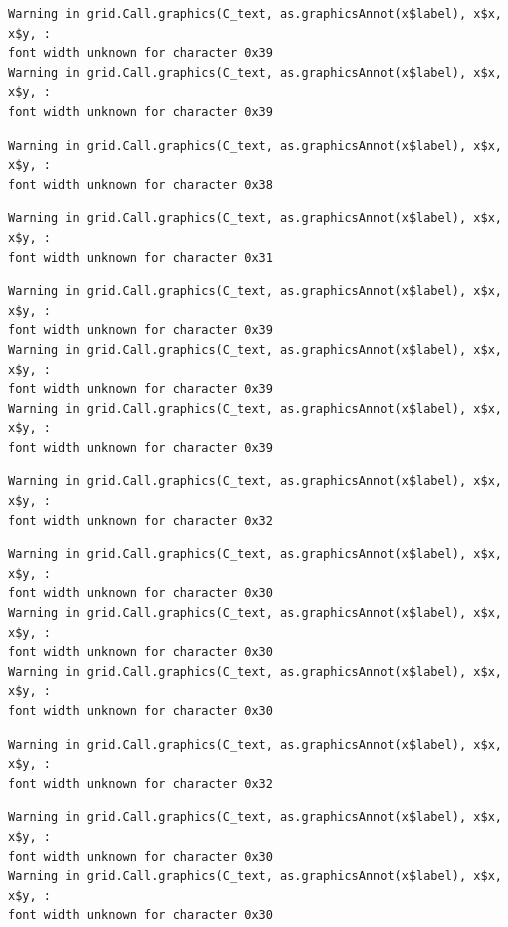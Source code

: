 \documentclass[
  letterpaper,
]{scrbook}
\begin{document}
\begin{verbatim}
Warning in grid.Call.graphics(C_text, as.graphicsAnnot(x$label), x$x, x$y, :
font width unknown for character 0x39
Warning in grid.Call.graphics(C_text, as.graphicsAnnot(x$label), x$x, x$y, :
font width unknown for character 0x39
\end{verbatim}

\begin{verbatim}
Warning in grid.Call.graphics(C_text, as.graphicsAnnot(x$label), x$x, x$y, :
font width unknown for character 0x38
\end{verbatim}

\begin{verbatim}
Warning in grid.Call.graphics(C_text, as.graphicsAnnot(x$label), x$x, x$y, :
font width unknown for character 0x31
\end{verbatim}

\begin{verbatim}
Warning in grid.Call.graphics(C_text, as.graphicsAnnot(x$label), x$x, x$y, :
font width unknown for character 0x39
Warning in grid.Call.graphics(C_text, as.graphicsAnnot(x$label), x$x, x$y, :
font width unknown for character 0x39
Warning in grid.Call.graphics(C_text, as.graphicsAnnot(x$label), x$x, x$y, :
font width unknown for character 0x39
\end{verbatim}

\begin{verbatim}
Warning in grid.Call.graphics(C_text, as.graphicsAnnot(x$label), x$x, x$y, :
font width unknown for character 0x32
\end{verbatim}

\begin{verbatim}
Warning in grid.Call.graphics(C_text, as.graphicsAnnot(x$label), x$x, x$y, :
font width unknown for character 0x30
Warning in grid.Call.graphics(C_text, as.graphicsAnnot(x$label), x$x, x$y, :
font width unknown for character 0x30
Warning in grid.Call.graphics(C_text, as.graphicsAnnot(x$label), x$x, x$y, :
font width unknown for character 0x30
\end{verbatim}

\begin{verbatim}
Warning in grid.Call.graphics(C_text, as.graphicsAnnot(x$label), x$x, x$y, :
font width unknown for character 0x32
\end{verbatim}

\begin{verbatim}
Warning in grid.Call.graphics(C_text, as.graphicsAnnot(x$label), x$x, x$y, :
font width unknown for character 0x30
Warning in grid.Call.graphics(C_text, as.graphicsAnnot(x$label), x$x, x$y, :
font width unknown for character 0x30
\end{verbatim}
\end{document}
